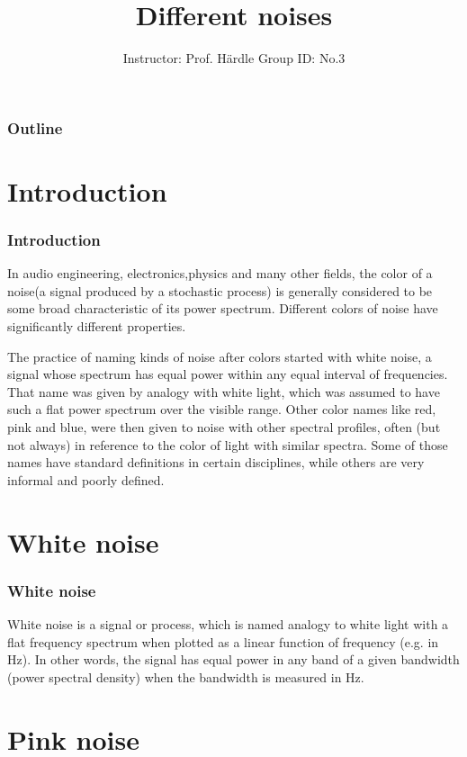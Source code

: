 \documentclass[12pt]{beamer}
\title{Different noises}
\author[Group ID: No.3]{Instructor:  Prof. H\"{a}rdle Group ID: No.3} %
\institute[]{
	\textsl{Project ID: No.18}
}
\date[July 20$^{th}, 2016$]{} %
\begin{document}
	
\begin{frame}
	\titlepage
\end{frame}
\begin{frame}
	\frametitle{Outline}
	\tableofcontents
\end{frame}


\section{Introduction}

\begin{frame}
	\frametitle{Introduction}
	\quad In audio engineering, electronics,physics and many other fields, the color of a noise(a signal produced by a stochastic process) is generally considered to be some broad characteristic of its power spectrum. Different colors of noise have significantly different properties.
    
    \quad The practice of naming kinds of noise after colors started with white noise, a signal whose spectrum has
    equal power within any equal interval of frequencies. That name was given by analogy with white light, which was assumed to have such a flat power spectrum over the visible range. Other color names like red, pink and blue, were then given to noise with other spectral profiles, often (but not always) in reference to the color of light with similar spectra. Some of those names have standard definitions in certain disciplines, while others are very informal and poorly defined.


\end{frame}

\section{White noise}
\begin{frame}
	\frametitle{White noise}
	\quad White noise is a signal or process, which is named analogy to white light with a flat frequency spectrum when plotted as a linear function of frequency (e.g. in Hz). In other words, the signal has equal power in any band of a given bandwidth (power spectral density) when the bandwidth is measured in Hz.

\end{frame}


\section{Pink noise}
\end{document}
